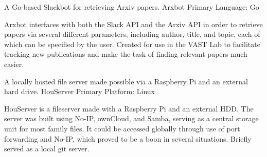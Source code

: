 

\begin{cventries}

  \cventry
    {A Go-based Slackbot for retrieving Arxiv papers.} %
    {Arxbot}
    {Primary Language: Go}
    {}
    {
      \begin{cvitems} %
        \item {Arxbot interfaces with both the Slack API and the Arxiv API in order to retrieve papers via several different parameters, including author, title, and topic, each of which can be specified by the user. Created for use in the VAST Lab to facilitate tracking new publications and make the task of finding relevant papers much easier.}
      \end{cvitems}
    }

    \cventry
        {A locally hosted file server made possible via a Raspberry Pi and an external hard drive.} %
        {HouServer}
        {Primary Platform: Linux}
        {}
        {
        \begin{cvitems} %
            \item {HouServer is a fileserver made with a Raspberry Pi and an external HDD. The server was built using No-IP, ownCloud, and Samba, serving as a central storage unit for most family files. It could be accessed globally through use of port forwarding and No-IP, which proved to be a boon in several situations. Briefly served as a local git server. } 
        \end{cvitems}
        }

\end{cventries}